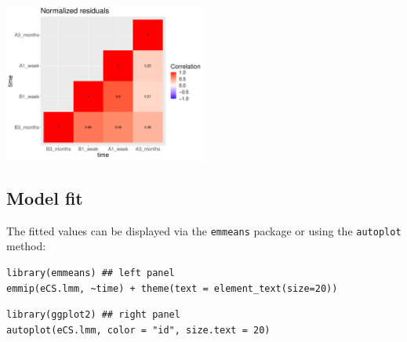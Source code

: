 \documentclass[12pt]{article}
\begin{document}
\begin{center}
\includegraphics[width=0.5\textwidth]{./figures/diag-correlation.pdf}
\end{center}


\subsection{Model fit}
\label{sec:org1f84fd2}

The fitted values can be displayed via the \texttt{emmeans} package or using the \texttt{autoplot} method:
\lstset{language=r,label= ,caption= ,captionpos=b,numbers=none}
\begin{lstlisting}
library(emmeans) ## left panel
emmip(eCS.lmm, ~time) + theme(text = element_text(size=20))
\end{lstlisting}

\lstset{language=r,label= ,caption= ,captionpos=b,numbers=none}
\begin{lstlisting}
library(ggplot2) ## right panel
autoplot(eCS.lmm, color = "id", size.text = 20)
\end{lstlisting}
\end{document}
